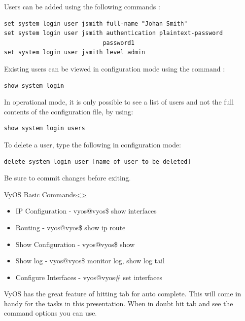 \documentclass[12pt]{article}
\newenvironment{instructionblock}{\Large\bgroup}{\egroup}
\begin{document}
\noindent Users can be added using the following commands \cite{vyoswiki}:
\begin{lstlisting}
set system login user jsmith full-name "Johan Smith" 
set system login user jsmith authentication plaintext-password 
							password1 
set system login user jsmith level admin 
\end{lstlisting}
Existing users can be viewed in configuration mode using the command \cite{vyoswiki}:
\begin{lstlisting}
show system login
\end{lstlisting}
In operational mode, it is only possible to see a list of users and not the full contents of the configuration file, by using:
\begin{lstlisting}
show system login users
\end{lstlisting}
To delete a user, type the following in configuration mode:
\begin{lstlisting}
delete system login user [name of user to be deleted]
\end{lstlisting}
Be sure to commit changes before exiting.


\pagebreak
\begin{slide}{VyOS Basic Commands}{\hyperref[slide 10]{\textless}\hyperref[slide 12]{\textgreater}}
\begin{instructionblock}
\begin{itemize}
\item IP Configuration - vyos@vyos\$ show interfaces
\item Routing - vyos@vyos\$ show ip route
\item Show Configuration - vyos@vyos\$ show
\item Show log - vyos@vyos\$ monitor log, show log tail
\item Configure Interfaces - vyos@vyos\# set interfaces
\end{itemize}
\end{instructionblock}
\end{slide}
VyOS has the great feature of hitting tab for auto complete. This will come in handy for the tasks in this presentation. When in doubt hit tab and see the command options you can use.
\end{document}

